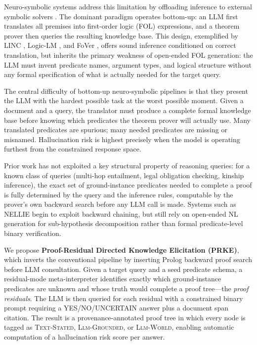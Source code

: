 \documentclass[11pt,letterpaper]{article}
\begin{document}
Neuro-symbolic systems address this limitation by offloading inference to external symbolic solvers \citep{Olausson2023,Pan2023}. The dominant paradigm operates bottom-up: an LLM first translates all premises into first-order logic (FOL) expressions, and a theorem prover then queries the resulting knowledge base. This design, exemplified by LINC \citep{Olausson2023}, Logic-LM \citep{Pan2023}, and FoVer \citep{Pei2025}, offers sound inference conditioned on correct translation, but inherits the primary weakness of open-ended FOL generation: the LLM must invent predicate names, argument types, and logical structure without any formal specification of what is actually needed for the target query.

The central difficulty of bottom-up neuro-symbolic pipelines is that they present the LLM with the hardest possible task at the worst possible moment. Given a document and a query, the translator must produce a complete formal knowledge base before knowing which predicates the theorem prover will actually use. Many translated predicates are spurious; many needed predicates are missing or misnamed. Hallucination risk is highest precisely when the model is operating furthest from the constrained response space.

Prior work has not exploited a key structural property of reasoning queries: for a known class of queries (multi-hop entailment, legal obligation checking, kinship inference), the exact set of ground-instance predicates needed to complete a proof is fully determined by the query and the inference rules, computable by the prover's own backward search before any LLM call is made. Systems such as NELLIE \citep{Weir2024} begin to exploit backward chaining, but still rely on open-ended NL generation for sub-hypothesis decomposition rather than formal predicate-level binary verification.

We propose \textbf{Proof-Residual Directed Knowledge Elicitation (PRKE)}, which inverts the conventional pipeline by inserting Prolog backward proof search before LLM consultation. Given a target query and a seed predicate schema, a residual-mode meta-interpreter identifies exactly which ground-instance predicates are unknown and whose truth would complete a proof tree---the \emph{proof residuals}. The LLM is then queried for each residual with a constrained binary prompt requiring a YES/NO/UNCERTAIN answer plus a document span citation. The result is a provenance-annotated proof tree in which every node is tagged as \textsc{Text-Stated}, \textsc{Llm-Grounded}, or \textsc{Llm-World}, enabling automatic computation of a hallucination risk score per answer.
\end{document}
